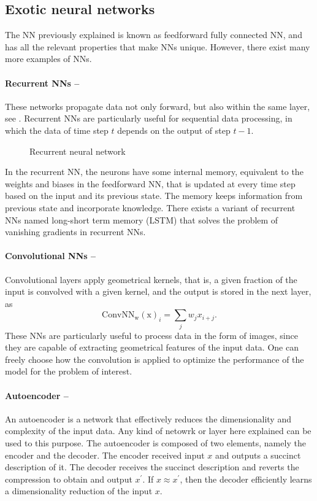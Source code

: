 \documentclass[]{report}
\begin{document}
\subsection{Exotic neural networks}

The NN previously explained is known as feedforward fully connected NN, and has all the relevant properties that make NNs unique. However, there exist many more examples of NNs. 

\paragraph{Recurrent NNs --} These networks propagate data not only forward, but also within the same layer, see . Recurrent NNs are particularly useful for sequential data processing, in which the data of time step $t$ depends on the output of step $t - 1$. 

\begin{figure}
\caption{Recurrent neural network}
\label{fig.recurrent-network}
\end{figure}

In the recurrent NN, the neurons have some internal memory, equivalent to the weights and biases in the feedforward NN, that is updated at every time step based on the input and its previous state. The memory keeps information from previous state and incorporate knowledge. There exists a variant of recurrent NNs named long-short term memory (LSTM) that solves the problem of vanishing gradients in recurrent NNs. 


\paragraph{Convolutional NNs --} Convolutional layers apply geometrical kernels, that is, a given fraction of the input is convolved with a given kernel, and the output is stored in the next layer, as
\begin{equation}
\operatorname{ConvNN_w(x)}_i = \sum_{j} w_j x_{i + j}.
\end{equation}
These NNs are particularly useful to process data in the form of images, since they are capable of extracting geometrical features of the input data. One can freely choose how the convolution is applied to optimize the performance of the model for the problem of interest. 

\paragraph{Autoencoder --}An autoencoder is a network that effectively reduces the dimensionality and complexity of the input data. Any kind of netowrk or layer here explained can be used to this purpose. The autoencoder is composed of two elements, namely the encoder and the decoder. The encoder received input $x$ and outputs a succinct description of it. The decoder receives the succinct description and reverts the compression to obtain and output $x^\prime$. If $x \approx x^\prime$, then the decoder efficiently learns a dimensionality reduction of the input $x$. 
\end{document}
